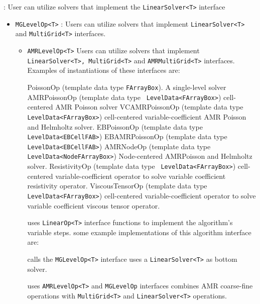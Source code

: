 : User can utilize solvers that implement the {\tt LinearSolver<T>} interface
\begin{itemize}
    \item[] {\tt MGLevelOp<T>} : Users can utilize solvers that implement {\tt LinearSolver<T>} and {\tt MultiGrid<T>} interfaces.
    \begin{itemize}
        \item[] {\tt AMRLevelOp<T>} Users can utilize solvers that implement {\tt LinearSolver<T>, MultiGrid<T>} and {\tt AMRMultiGrid<T>} interfaces. Examples of instantiations of these interfaces are:
        \begin{itemize}
            \I PoissonOp  (template data type {\tt FArrayBox}).  A single-level solver
            \I AMRPoissonOp  (template data type {\tt
            LevelData<FArrayBox>}) cell-centered AMR Poisson solver
            \I VCAMRPoissonOp (template data type {\tt
            LevelData<FArrayBox>}) cell-centered variable-coefficient
            AMR Poisson and Helmholtz solver.
            \I EBPoissonOp (template data type {\tt LevelData<EBCellFAB>})
            \I EBAMRPoissonOp (template data type {\tt LevelData<EBCellFAB>})
            \I AMRNodeOp (template data type {\tt LevelData<NodeFArrayBox>})
            Node-centered AMRPoisson and Helmholtz solver.
            \I ResistivityOp (template data type {\tt
            LevelData<FArrayBox>}) cell-centered variable-coefficient
            operator to solve variable coefficient resistivity operator.
            \I ViscousTensorOp (template data type {\tt
            LevelData<FArrayBox>}) cell-centered variable-coefficient
            operator to solve variable coefficient viscous tensor operator.
        \ei
    \ei
\ei


\begin{itemize}
    \I uses {\tt LinearOp<T>} interface functions to implement the algorithm's variable steps. 
    \I some example implementations of this algorithm interface are:
    \begin{itemize}
    \ei
\ei

\begin{itemize}
    \I calls  the {\tt MGLevelOp<T>} interface
    \I uses a {\tt LinearSolver<T>} as bottom solver.
\ei

\begin{itemize} 
    \I uses {\tt AMRLevelOp<T>} and {\tt MGLevelOp} interfaces 
    \I combines AMR coarse-fine operations with {\tt MultiGrid<T>} 
        and {\tt LinearSolver<T>} operations.
\ei


\end{itemize}
\end{itemize}
\end{itemize}
\end{itemize}
\end{itemize}
\end{itemize}
\end{itemize}
